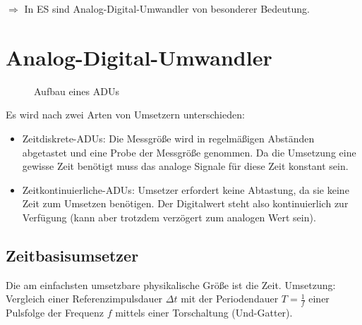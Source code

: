 $\Rightarrow$ In ES sind Analog-Digital-Umwandler von besonderer Bedeutung.

\section{Analog-Digital-Umwandler}
\begin{figure}[H]
    \centering
    \caption{Aufbau eines ADUs}
\end{figure}

Es wird nach zwei Arten von Umsetzern unterschieden:
\begin{itemize}
    \item Zeitdiskrete-ADUs: Die Messgröße wird in regelmäßigen Abständen abgetastet und eine Probe der Messgröße genommen. Da die Umsetzung eine gewisse Zeit
        benötigt muss das analoge Signale für diese Zeit konstant sein.
    \item Zeitkontinuierliche-ADUs: Umsetzer erfordert keine Abtastung, da sie keine Zeit zum Umsetzen benötigen. Der Digitalwert steht also kontinuierlich zur
        Verfügung (kann aber trotzdem verzögert zum analogen Wert sein).
\end{itemize}

\subsection{Zeitbasisumsetzer}
Die am einfachsten umsetzbare physikalische Größe ist die Zeit. 
Umsetzung: Vergleich einer Referenzimpulsdauer $\Delta t$ mit der Periodendauer $T = \frac{1}{f}$ einer Pulsfolge der Frequenz $f$ mittels einer Torschaltung
(Und-Gatter).

